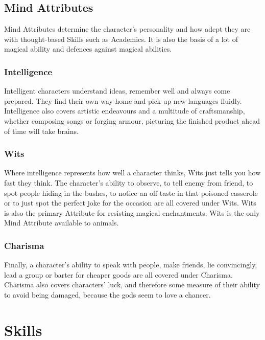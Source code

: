 \begin{multicols}{2}
\subsection{Mind Attributes}

Mind Attributes determine the character's personality and how adept they are with thought-based Skills such as Academics. It is also the basis of a lot of magical ability and defences against magical abilities.

\subsubsection{Intelligence}

Intelligent characters understand ideas, remember well and always come prepared. They find their own way home and pick up new languages fluidly. Intelligence also covers artistic endeavours and a multitude of craftsmanship, whether composing songs or forging armour, picturing the finished product ahead of time will take brains.

\subsubsection{Wits}

Where intelligence represents how well a character thinks, Wits just tells you how fast they think. The character's ability to observe, to tell enemy from friend, to spot people hiding in the bushes, to notice an off taste in that poisoned casserole or to just spot the perfect joke for the occasion are all covered under Wits. Wits is also the primary Attribute for resisting magical enchantments. Wits is the only Mind Attribute available to animals.

\subsubsection{Charisma}

Finally, a character's ability to speak with people, make friends, lie convincingly, lead a group or barter for cheaper goods are all covered under Charisma. Charisma also covers characters' luck, and therefore some measure of their ability to avoid being damaged, because the gods seem to love a chancer.

\end{multicols}

\section{Skills}

